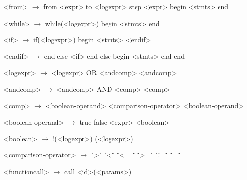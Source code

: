 \begin{grammar}
<from> $\rightarrow$ from <expr> to <logexpr> step <expr>
	begin
		<stmts>
	end 

<while> $\rightarrow$ while(<logexpr>)
		begin
			<stmts>
		end

<if> $\rightarrow$ if(<logexpr>)
	begin
		<stmts>
	<endif>

<endif> $\rightarrow$ end
	else <if>
	\alt end
	else
	begin
		<stmts>
	end
	\alt end

<logexpr> $\rightarrow$ <logexpr> OR <andcomp>
		\alt <andcomp>

<andcomp> $\rightarrow$ <andcomp> AND <comp>

<comp> $\rightarrow$ <boolean-operand> <comparison-operator> <boolean-operand>

<boolean-operand> $\rightarrow$ true
		\alt false
		\alt <boolean>

<boolean> $\rightarrow$ !(<logexpr>)
		\alt (<logexpr>)

<comparison-operator> $\rightarrow$ ">"
				\alt "<"
				\alt "<= "
				\alt ">="
				\alt "!="
				\alt "="

<functioncall> $\rightarrow$ call <id>(<params>)

\end{grammar}
